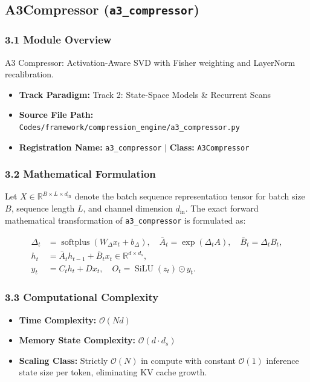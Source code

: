\subsection{A3Compressor (\texttt{a3\_compressor})}
\label{sec:app_module_a3_compressor}

\subsubsection*{3.1 Module Overview}
A3 Compressor: Activation-Aware SVD with Fisher weighting and LayerNorm recalibration.
\begin{itemize}
    \item \textbf{Track Paradigm:} Track 2: State-Space Models & Recurrent Scans
    \item \textbf{Source File Path:} \texttt{Codes/framework/compression\_engine/a3\_compressor.py}
    \item \textbf{Registration Name:} \texttt{a3\_compressor} $\mid$ \textbf{Class:} \texttt{A3Compressor}
\end{itemize}

\subsubsection*{3.2 Mathematical Formulation}
Let $X \in \mathbb{R}^{B \times L \times d_{\text{in}}}$ denote the batch sequence representation tensor for batch size $B$, sequence length $L$, and channel dimension $d_{\text{in}}$. The exact forward mathematical transformation of \texttt{a3\_compressor} is formulated as:

\begin{align}
\Delta_t &= \operatorname{softplus}(W_\Delta x_t + b_\Delta), \quad \bar{A}_t = \exp(\Delta_t A), \quad \bar{B}_t = \Delta_t B_t, \\
h_t &= \bar{A}_t h_{t-1} + \bar{B}_t x_t \in \mathbb{R}^{d \times d_s}, \\
y_t &= C_t h_t + D x_t, \quad O_t = \operatorname{SiLU}(z_t) \odot y_t.
\end{align}


\subsubsection*{3.3 Computational Complexity}
\begin{itemize}
    \item \textbf{Time Complexity:} $\mathcal{O}(N d)$
    \item \textbf{Memory State Complexity:} $\mathcal{O}(d \cdot d_s)$
    \item \textbf{Scaling Class:} Strictly $\mathcal{O}(N)$ in compute with constant $\mathcal{O}(1)$ inference state size per token, eliminating KV cache growth.
\end{itemize}

